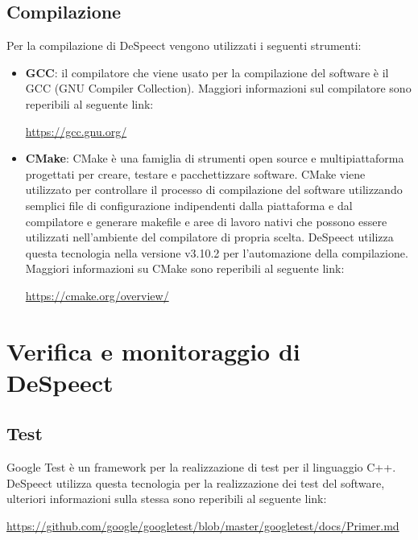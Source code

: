 \documentclass[openany,12pt,a4paper]{report}
\begin{document}
	\subsection{Compilazione}
	
	Per la compilazione di DeSpeect vengono utilizzati i seguenti strumenti:
	
	\begin{itemize}
	\item \textbf{GCC}: il compilatore che viene usato per la compilazione del software è il GCC (GNU Compiler Collection). Maggiori informazioni sul compilatore sono reperibili al seguente link:
	\begin{center}
		\centerline{\url{https://gcc.gnu.org/}}
	\end{center}
	
	\item \textbf{CMake}: CMake è una famiglia di strumenti open source e multipiattaforma progettati per creare, testare e pacchettizzare software. CMake viene utilizzato per controllare il processo di compilazione del software utilizzando semplici file di configurazione indipendenti dalla piattaforma e dal compilatore e generare makefile e aree di lavoro nativi che possono essere utilizzati nell'ambiente del compilatore di propria scelta. DeSpeect utilizza questa tecnologia nella versione v3.10.2 per l’automazione della compilazione. Maggiori informazioni su CMake sono reperibili al seguente link:
	\begin{center}
		\centerline{\url{https://cmake.org/overview/}}
	\end{center}
	
	\end{itemize} 
	
	\section{Verifica e monitoraggio di DeSpeect}	
	
	\subsection{Test}
	Google Test è un framework per la realizzazione di test per il linguaggio C++. DeSpeect utilizza questa tecnologia per la realizzazione dei test del software, ulteriori informazioni sulla stessa sono reperibili al seguente link:
	\begin{center}
		\url{https://github.com/google/googletest/blob/master/googletest/docs/Primer.md}
	\end{center}
\end{document}
